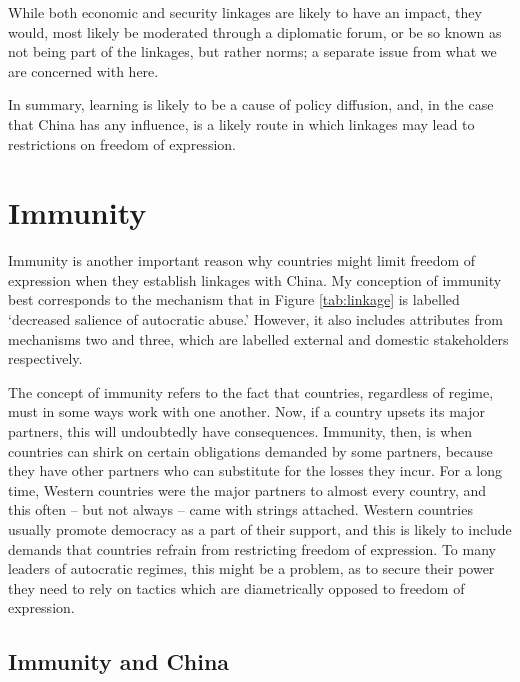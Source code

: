 While both economic and security linkages are likely to have an impact, they would, most likely be moderated through a diplomatic forum, or be so known as not being part of the linkages, but rather norms; a separate issue from what we are concerned with here.

In summary, learning is likely to be a cause of policy diffusion, and, in the case that China has any influence, is a likely route in which linkages may lead to restrictions on freedom of expression.

\section{Immunity}
Immunity is another important reason why countries might limit freedom of expression when they establish linkages with China. My conception of immunity best corresponds to the mechanism that in Figure \ref{tab:linkage} is labelled `decreased salience of autocratic abuse.' However, it also includes attributes from mechanisms two and three, which are labelled external and domestic stakeholders respectively. 

The concept of immunity refers to the fact that countries, regardless of regime, must in some ways work with one another. Now, if a country upsets its major partners, this will undoubtedly have consequences. Immunity, then, is when countries can shirk on certain obligations demanded by some partners, because they have other partners who can substitute for the losses they incur. For a long time, Western countries were the major partners to almost every country, and this often -- but not always \citep{borzel_noble_2015, wong_chinese_2019} -- came with strings attached. Western countries usually promote democracy as a part of their support, and this is likely to include demands that countries refrain from restricting freedom of expression. To many leaders of autocratic regimes, this might be a problem, as to secure their power they need to rely on tactics which are diametrically opposed to freedom of expression.

\subsection{Immunity and China}

